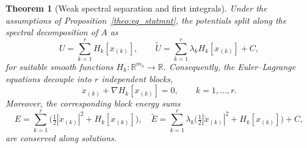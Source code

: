 \documentclass[10pt,a4paper]{amsart}
\newtheorem{theorem}{Theorem}
\begin{document}
\begin{theorem}[Weak spectral separation and first integrals]
\label{th:weak}
Under the assumptions of Proposition~\ref{theo:eq_statmnt}, the potentials split
along the spectral decomposition of $A$ as
\begin{equation}
\label{eq:weak-potentials}
U=\sum_{k=1}^r H_k[x_{(k)}],
\qquad
\widetilde U=\sum_{k=1}^r \lambda_k H_k[x_{(k)}]+C,
\end{equation}
for suitable smooth functions $H_k:\mathbb{R}^{m_k}\to\mathbb{R}$. Consequently,
the Euler--Lagrange equations decouple into $r$ independent blocks,
\begin{equation}
\label{eq:weak-eom}
\ddot x_{(k)}+\nabla H_k[x_{(k)}]=0,
\qquad k=1,\dots,r.
\end{equation}
Moreover, the corresponding block energy sums
\begin{equation}
\label{eq:weak-energies}
E=\sum_{k=1}^r\!\Big(\tfrac12|\dot x_{(k)}|^2+H_k[x_{(k)}]\Big),
\quad
\widetilde E=\sum_{k=1}^r \lambda_k\!\Big(\tfrac12|\dot x_{(k)}|^2+H_k[x_{(k)}]\Big)+C,
\end{equation}
are conserved along solutions.
\end{theorem}
\end{document}
